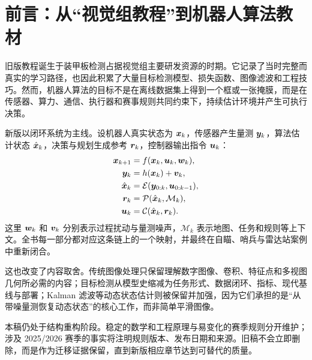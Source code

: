 \chapter*{前言：从“视觉组教程”到机器人算法教材}

旧版教程诞生于装甲板检测占据视觉组主要研发资源的时期。它记录了当时完整而真实的学习路径，也因此积累了大量目标检测模型、损失函数、图像滤波和工程技巧。然而，机器人算法的目标不是在离线数据集上得到一个框或一张掩膜，而是在传感器、算力、通信、执行器和赛事规则共同约束下，持续估计环境并产生可执行决策。

新版以闭环系统为主线。设机器人真实状态为 $\bm{x}_k$，传感器产生量测 $\bm{y}_k$，算法估计状态 $\hat{\bm{x}}_k$，决策与规划生成参考 $\bm{r}_k$，控制器输出指令 $\bm{u}_k$：
\begin{align}
  \bm{x}_{k+1} &= f(\bm{x}_k,\bm{u}_k,\bm{w}_k), \\
  \bm{y}_k &= h(\bm{x}_k)+\bm{v}_k, \\
  \hat{\bm{x}}_k &= \mathcal{E}(\bm{y}_{0:k},\bm{u}_{0:k-1}), \\
  \bm{r}_k &= \mathcal{P}(\hat{\bm{x}}_k,\mathcal{M}_k), \\
  \bm{u}_k &= \mathcal{C}(\hat{\bm{x}}_k,\bm{r}_k).
\end{align}
这里 $\bm{w}_k$ 和 $\bm{v}_k$ 分别表示过程扰动与量测噪声，$\mathcal{M}_k$ 表示地图、任务和规则等上下文。全书每一部分都对应这条链上的一个映射，并最终在自瞄、哨兵与雷达站案例中重新闭合。

这也改变了内容取舍。传统图像处理只保留理解数字图像、卷积、特征点和多视图几何所必需的内容；目标检测从模型史缩减为任务形式、数据闭环、指标、现代基线与部署；Kalman 滤波等动态状态估计则被保留并加强，因为它们承担的是“从带噪量测恢复动态状态”的核心工作，而非简单平滑图像。

本稿仍处于结构重构阶段。稳定的数学和工程原理与易变化的赛季规则分开维护；涉及 2025/2026 赛季的事实将注明规则版本、发布日期和来源。旧稿不会立即删除，而是作为迁移证据保留，直到新版相应章节达到可替代的质量。

